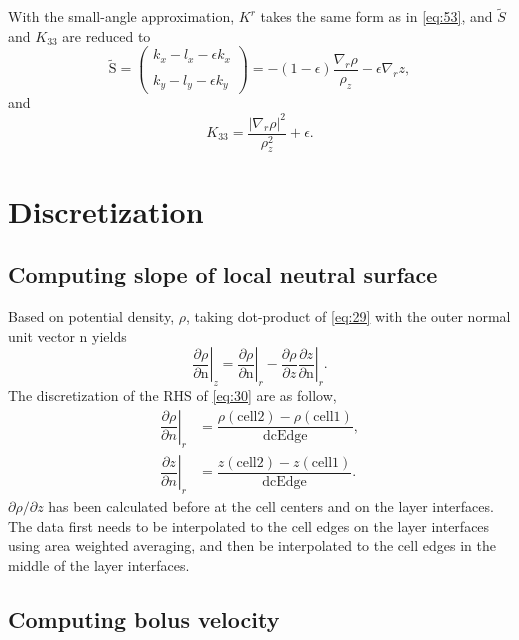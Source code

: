\documentclass[12pt]{report}
\def\p{\partial}
\def\tilde{\widetilde}
\def\bs{\boldsymbol}
\def\nb{\bs{\mathrm{n}}}
\def\Sb{\bs{\mathrm{S}}}
\begin{document}
With the small-angle  approximation, $K^r$ takes the same form as in
\eqref{eq:53}, and $\tilde{S}$ and $K_{33}$ are reduced to 
\begin{equation}
\label{eq:56}
 \tilde{\Sb} = \left(\begin{matrix}k_x- l_x - \epsilon k_x \\
 \\ 
  k_y-l_y - \epsilon k_y
  \end{matrix}\right) =  -(1-\epsilon)\dfrac{\nabla_r\rho}{\rho_z} - 
  \epsilon\nabla_r z,
\end{equation}
and 
\begin{equation}
\label{eq:57}
K_{33} = \dfrac{|\nabla_r\rho|^2}{\rho_z^2}+\epsilon.
\end{equation}


\section{Discretization}

\subsection{Computing slope of local neutral surface}

Based on potential density, $\rho$, taking dot-product of \eqref{eq:29} with the outer normal unit vector
$\nb$ yields
\begin{equation}
\left.\dfrac{\p\rho}{\p \mathrm{n}}\right|_z = 
\left.\dfrac{\p\rho}{\p\mathrm{n}}\right|_r - \left.\dfrac{\p\rho}{\p z}
\dfrac{\p z}{\p\mathrm{n}}\right|_r.
\label{eq:30}
\end{equation}
The discretization of the RHS of \eqref{eq:30} are as follow,
\begin{align*}
\left.\dfrac{\p\rho}{\p n}\right|_r &= 
\dfrac{\rho(\textrm{cell2}) - \rho(\textrm{cell1})}{\textrm{dcEdge}},\\
\left.\dfrac{\p z}{\p n}\right|_r &= 
\dfrac{z(\textrm{cell2}) - z(\textrm{cell1})}{\textrm{dcEdge}}.
\end{align*}
$\p\rho/\p z$ has been calculated before at the cell centers and on 
the layer interfaces. The data first needs to be interpolated to the cell 
edges on the layer interfaces using area weighted averaging, and then
be interpolated to the cell edges in the middle of the layer 
interfaces.

\subsection{Computing bolus velocity}
\end{document}
